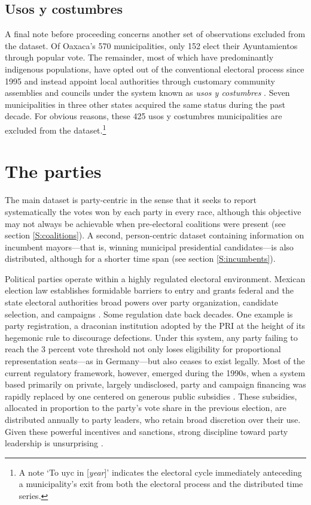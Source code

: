 \documentclass[letter,12pt]{article}
\begin{document}
\subsection{Usos y costumbres}\label{S:uyc}

A final note before proceeding concerns another set of observations excluded from the dataset. Of Oaxaca's 570 municipalities, only 152 elect their Ayuntamientos through popular vote. The remainder, most of which have predominantly indigenous populations, have opted out of the conventional electoral process since 1995 and instead appoint local authorities through customary community assemblies and councils under the system known as \emph{usos y costumbres} \citep[see][]{elizarraras.2002, eisenstadt.rios.uyc.2014, magaloni.etal.2021}. Seven municipalities in three other states acquired the same status during the past decade. For obvious reasons, these 425 usos y costumbres municipalities are excluded from the dataset.\footnote{A note `To uyc in [\emph{year}]' indicates the electoral cycle immediately anteceding a municipality's exit from both the electoral process and the distributed time series.}

\section{The parties}
The main dataset is party-centric in the sense that it seeks to report systematically the votes won by each party in every race, although this objective may not always be achievable when pre-electoral coalitions were present (see section \ref{S:coalitions}). A second, person-centric dataset containing information on incumbent mayors---that is, winning municipal presidential candidates---is also distributed, although for a shorter time span (see section \ref{S:incumbents}). 

Political parties operate within a highly regulated electoral environment. Mexican election law establishes formidable barriers to entry and grants federal and the state electoral authorities broad powers over party organization, candidate selection, and campaigns \citep{estevez.ref2007.2007, magar.2007ref.2015}. Some regulation date back decades. One example is party registration, a draconian institution adopted by the PRI at the height of its hegemonic rule to discourage defections. Under this system, any party failing to reach the 3 percent vote threshold not only loses eligibility for proportional representation seats---as in Germany---but also ceases to exist legally. Most of the current regulatory framework, however, emerged during the 1990s, when a system based primarily on private, largely undisclosed, party and campaign financing was rapidly replaced by one centered on generous public subsidies \citep{poire.Money2005}. These subsidies, allocated in proportion to the party's vote share in the previous election, are distributed annually to party leaders, who retain broad discretion over their use. Given these powerful incentives and sanctions, strong discipline toward party leadership is unsurprising \citep{weldon.1997}.
\end{document}
